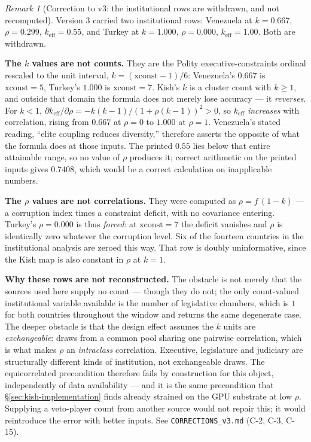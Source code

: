 \documentclass[11pt,a4paper]{article}
\theoremstyle{definition}
\theoremstyle{remark}
\newtheorem{remark}{Remark}[section]
\newcommand{\keff}{k_{\text{eff}}}
\begin{document}
\begin{remark}[Correction to v3: the institutional rows are withdrawn, and not recomputed]
\label{rem:inst-k}
Version 3 carried two institutional rows: Venezuela at $k = 0.667$, $\rho = 0.299$, $\keff = 0.55$, and Turkey at $k = 1.000$, $\rho = 0.000$, $\keff = 1.00$. Both are withdrawn.

\textbf{The $k$ values are not counts.} They are the Polity executive-constraints ordinal rescaled to the unit interval, $k = (\mathrm{xconst}-1)/6$: Venezuela's $0.667$ is $\mathrm{xconst}=5$, Turkey's $1.000$ is $\mathrm{xconst}=7$. Kish's $k$ is a cluster count with $k \geq 1$, and outside that domain the formula does not merely lose accuracy --- it \emph{reverses}. For $k < 1$, $\partial\keff/\partial\rho = -k(k-1)/(1+\rho(k-1))^2 > 0$, so $\keff$ \emph{increases} with correlation, rising from $0.667$ at $\rho=0$ to $1.000$ at $\rho=1$. Venezuela's stated reading, ``elite coupling reduces diversity,'' therefore asserts the opposite of what the formula does at those inputs. The printed $0.55$ lies below that entire attainable range, so no value of $\rho$ produces it; correct arithmetic on the printed inputs gives $0.7408$, which would be a correct calculation on inapplicable numbers.

\textbf{The $\rho$ values are not correlations.} They were computed as $\rho = f\,(1-k)$ --- a corruption index times a constraint deficit, with no covariance entering. Turkey's $\rho = 0.000$ is thus \emph{forced}: at $\mathrm{xconst}=7$ the deficit vanishes and $\rho$ is identically zero whatever the corruption level. Six of the fourteen countries in the institutional analysis are zeroed this way. That row is doubly uninformative, since the Kish map is also constant in $\rho$ at $k=1$.

\textbf{Why these rows are not reconstructed.} The obstacle is not merely that the sources used here supply no count --- though they do not; the only count-valued institutional variable available is the number of legislative chambers, which is $1$ for both countries throughout the window and returns the same degenerate case. The deeper obstacle is that the design effect assumes the $k$ units are \emph{exchangeable}: draws from a common pool sharing one pairwise correlation, which is what makes $\rho$ an \emph{intraclass} correlation. Executive, legislature and judiciary are structurally different kinds of institution, not exchangeable draws. The equicorrelated precondition therefore fails by construction for this object, independently of data availability --- and it is the same precondition that \S\ref{sec:kish-implementation} finds already strained on the GPU substrate at low $\rho$. Supplying a veto-player count from another source would not repair this; it would reintroduce the error with better inputs. See \texttt{CORRECTIONS\_v3.md} (C-2, C-3, C-15).
\end{remark}
\end{document}
